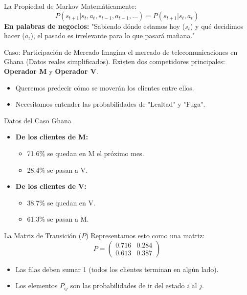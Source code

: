\documentclass{beamer}
\begin{document}
\begin{frame}{La Propiedad de Markov}
Matemáticamente:
\[ P(s_{t+1} | s_t, a_t, s_{t-1}, a_{t-1}, \dots) = P(s_{t+1} | s_t, a_t) \]
\vspace{0.3cm}
\textbf{En palabras de negocios:}
"Sabiendo dónde estamos hoy ($s_t$) y qué decidimos hacer ($a_t$), el pasado es irrelevante para lo que pasará mañana."
\end{frame}

\begin{frame}{Caso: Participación de Mercado}
Imagina el mercado de telecomunicaciones en Ghana (Datos reales simplificados).
Existen dos competidores principales: \textbf{Operador M} y \textbf{Operador V}.
\begin{itemize}
    \item Queremos predecir cómo se moverán los clientes entre ellos.
    \item Necesitamos entender las probabilidades de "Lealtad" y "Fuga".
\end{itemize}
\end{frame}

\begin{frame}{Datos del Caso Ghana}
\begin{itemize}
    \item \textbf{De los clientes de M:}
    \begin{itemize}
        \item 71.6\% se quedan en M el próximo mes.
        \item 28.4\% se pasan a V.
    \end{itemize}
    \vspace{0.3cm}
    \item \textbf{De los clientes de V:}
    \begin{itemize}
        \item 38.7\% se quedan en V.
        \item 61.3\% se pasan a M.
    \end{itemize}
\end{itemize}
\end{frame}

\begin{frame}{La Matriz de Transición ($P$)}
Representamos esto como una matriz:
\[
P = 
\begin{pmatrix}
0.716 & 0.284 \\
0.613 & 0.387
\end{pmatrix}
\]
\begin{itemize}
    \item Las filas deben sumar 1 (todos los clientes terminan en algún lado).
    \item Los elementos $P_{ij}$ son las probabilidades de ir del estado $i$ al $j$.
\end{itemize}
\end{frame}
\end{document}
